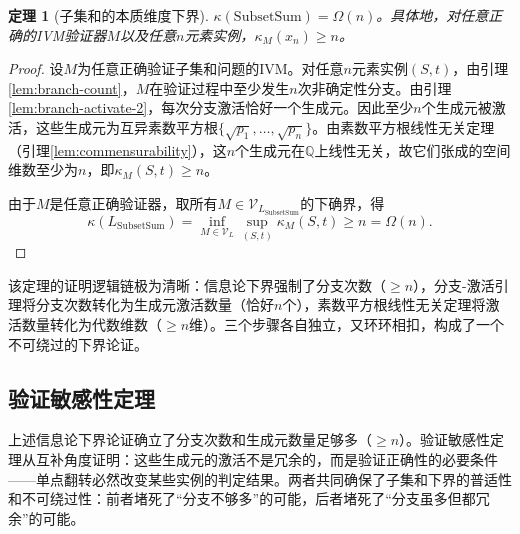 \documentclass{ctexart}
\newtheorem{theorem}{定理}[section]
\newtheorem{proof}[theorem]{证明}
\begin{document}
	\begin{theorem}[子集和的本质维度下界]\label{thm:subset-sum-lower}
		$\kappa(\mathrm{SubsetSum}) = \Omega(n)$。具体地，对任意正确的IVM验证器$M$以及任意$n$元素实例，$\kappa_M(x_n) \ge n$。
	\end{theorem}
	\begin{proof}
		设$M$为任意正确验证子集和问题的IVM。对任意$n$元素实例$(S, t)$，由引理\ref{lem:branch-count}，$M$在验证过程中至少发生$n$次非确定性分支。由引理\ref{lem:branch-activate-2}，每次分支激活恰好一个生成元。因此至少$n$个生成元被激活，这些生成元为互异素数平方根$\{\sqrt{p_1}, \dots, \sqrt{p_n}\}$。由素数平方根线性无关定理（引理\ref{lem:commensurability}），这$n$个生成元在$\mathbb{Q}$上线性无关，故它们张成的空间维数至少为$n$，即$\kappa_M(S, t) \ge n$。
		
		由于$M$是任意正确验证器，取所有$M \in \mathcal{V}_{L_{\mathrm{SubsetSum}}}$的下确界，得
		\[
		\kappa(L_{\mathrm{SubsetSum}}) = \inf_{M \in \mathcal{V}_L} \sup_{(S,t)} \kappa_M(S, t) \ge n = \Omega(n).
		\]
	\end{proof}
	
	该定理的证明逻辑链极为清晰：信息论下界强制了分支次数（$\ge n$），分支-激活引理将分支次数转化为生成元激活数量（恰好$n$个），素数平方根线性无关定理将激活数量转化为代数维数（$\ge n$维）。三个步骤各自独立，又环环相扣，构成了一个不可绕过的下界论证。
	
	\subsection{验证敏感性定理}
	
	上述信息论下界论证确立了分支次数和生成元数量足够多（$\ge n$）。验证敏感性定理从互补角度证明：这些生成元的激活不是冗余的，而是验证正确性的必要条件——单点翻转必然改变某些实例的判定结果。两者共同确保了子集和下界的普适性和不可绕过性：前者堵死了``分支不够多''的可能，后者堵死了``分支虽多但都冗余''的可能。
	
\end{document}
